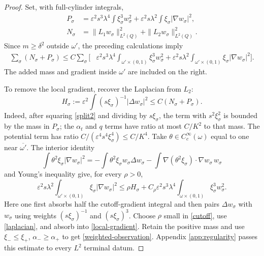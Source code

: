 \documentclass[11pt]{article}
\theoremstyle{remark}
\newcommand{\eps}{\varepsilon}
\begin{document}
\begin{proof}
Set, with full-cylinder integrals,
\begin{align*}
 P_\sigma&=\eps^2s^3\lambda^4\int\xi_\sigma^3w_\sigma^2
           +\eps^2s\lambda^2\int\xi_\sigma|\nabla w_\sigma|^2,\\
 N_\sigma&=\|L_1w_\sigma\|_{L^2(Q)}^2+\|L_2w_\sigma\|_{L^2(Q)}^2.
\end{align*}
Since $m\ge\delta^2$ outside $\omega'$, the preceding calculations imply
\begin{align}\label{local-gradient}
 \sum_\sigma(N_\sigma+P_\sigma)
 \le C\sum_\sigma\biggl[&\eps^2s^3\lambda^4
        \int_{\omega'\times(0,1)}\xi_\sigma^3w_\sigma^2
 +\eps^2s\lambda^2\int_{\omega'\times(0,1)}
                         \xi_\sigma|\nabla w_\sigma|^2\biggr].
\end{align}
The added mass and gradient inside $\omega'$ are included on the right.

To remove the local gradient, recover the Laplacian from $L_2$:
\begin{equation}\label{laplacian}
 H_\sigma:=\eps^2\int(s\xi_\sigma)^{-1}|\Delta w_\sigma|^2
                \le C(N_\sigma+P_\sigma).
\end{equation}
Indeed, after squaring \eqref{split2} and dividing by $s\xi_\sigma$,
the term with $s^2\xi_\sigma^2$ is bounded by the mass in $P_\sigma$;
the $\alpha_t$ and $q$ terms have ratio at most $C/K^2$ to that mass.
The potential term has ratio
$C/(\eps^4s^4\xi_\sigma^4)\le C/K^4$.
Take $\theta\in C_c^\infty(\omega)$ equal to one near
$\overline{\omega'}$. The interior identity
\[
 \int\theta^2\xi_\sigma|\nabla w_\sigma|^2
 =-\int\theta^2\xi_\sigma w_\sigma\Delta w_\sigma
   -\int\nabla(\theta^2\xi_\sigma)\cdot\nabla w_\sigma\,w_\sigma
\]
and Young's inequality give, for every $\rho>0$,
\begin{equation}\label{cutoff}
 \eps^2s\lambda^2\int_{\omega'\times(0,1)}
                       \xi_\sigma|\nabla w_\sigma|^2
 \le\rho H_\sigma+C_\rho\eps^2s^3\lambda^4
                  \int_{\omega\times(0,1)}\xi_\sigma^3w_\sigma^2.
\end{equation}
Here one first absorbs half the cutoff-gradient integral and then pairs
$\Delta w_\sigma$ with $w_\sigma$ using weights
$(s\xi_\sigma)^{-1}$ and $(s\xi_\sigma)^3$.
Choose $\rho$ small in \eqref{cutoff}, use \eqref{laplacian}, and absorb
into \eqref{local-gradient}. Retain the positive mass and use
$\xi_-\le\xi_+$, $\alpha_-\ge\alpha_+$ to get
\eqref{weighted-observation}. Appendix \ref{app:regularity} passes this
estimate to every $L^2$ terminal datum.
\end{proof}
\end{document}

